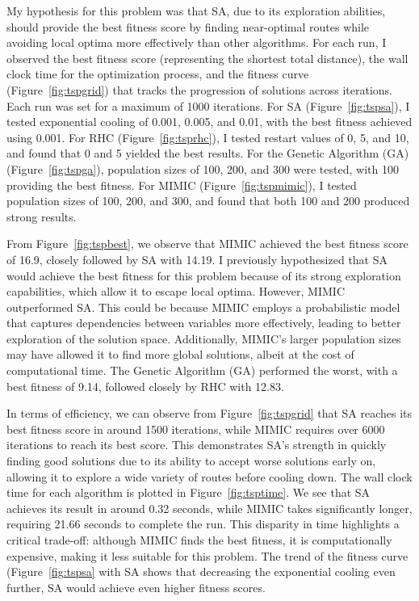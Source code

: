 My hypothesis for this problem was that SA, due to its exploration abilities, should provide the best fitness score by finding near-optimal routes while avoiding local optima more effectively than other algorithms. For each run, I observed the best fitness score (representing the shortest total distance), the wall clock time for the optimization process, and the fitness curve (Figure~\ref{fig:tspgrid}) that tracks the progression of solutions across iterations. Each run was set for a maximum of 1000 iterations. For SA (Figure~\ref{fig:tspsa}), I tested exponential cooling of 0.001, 0.005, and 0.01, with the best fitness achieved using 0.001. For RHC (Figure~\ref{fig:tsprhc}), I tested restart values of 0, 5, and 10, and found that 0 and 5 yielded the best results. For the Genetic Algorithm (GA) (Figure~\ref{fig:tspga}), population sizes of 100, 200, and 300 were tested, with 100 providing the best fitness. For MIMIC (Figure~\ref{fig:tspmimic}), I tested population sizes of 100, 200, and 
300, and found that both 100 and 200 produced strong results.

From Figure~\ref{fig:tspbest}, we observe that MIMIC achieved the best fitness score of 16.9, closely followed by SA with 14.19. I previously hypothesized that SA would achieve the best fitness for this problem because of its strong exploration capabilities, which allow it to escape local optima. However, MIMIC outperformed SA. This could be because MIMIC employs a probabilistic model that captures dependencies between variables more effectively, leading to better exploration of the solution space. Additionally, MIMIC’s larger population sizes may have allowed it to find more global solutions, albeit at the cost of computational time. The Genetic Algorithm (GA) performed the worst, with a best fitness of 9.14, followed closely by RHC with 12.83.

In terms of efficiency, we can observe from Figure~\ref{fig:tspgrid} that SA reaches its best fitness score in around 1500 iterations, while MIMIC requires over 6000 iterations to reach its best score. This demonstrates SA's strength in quickly finding good solutions due to its ability to accept worse solutions early on, allowing it to explore a wide variety of routes before cooling down. The wall clock time for each algorithm is plotted in Figure~\ref{fig:tsptime}. We see that SA achieves its result in around 0.32 seconds, while MIMIC takes significantly longer, requiring 21.66 seconds to complete the run. This disparity in time highlights a critical trade-off: although MIMIC finds the best fitness, it is computationally expensive, making it less suitable for this problem. The trend of the fitness curve (Figure~\ref{fig:tspsa}  with SA shows that decreasing the exponential cooling even further, SA would achieve even higher fitness scores.

